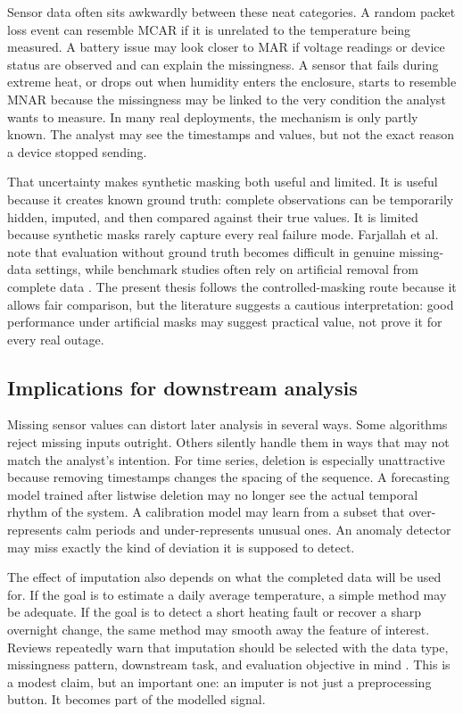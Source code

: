 Sensor data often sits awkwardly between these neat categories. A random packet loss event can resemble MCAR if it is unrelated to the temperature being measured. A battery issue may look closer to MAR if voltage readings or device status are observed and can explain the missingness. A sensor that fails during extreme heat, or drops out when humidity enters the enclosure, starts to resemble MNAR because the missingness may be linked to the very condition the analyst wants to measure. In many real deployments, the mechanism is only partly known. The analyst may see the timestamps and values, but not the exact reason a device stopped sending.

That uncertainty makes synthetic masking both useful and limited. It is useful because it creates known ground truth: complete observations can be temporarily hidden, imputed, and then compared against their true values. It is limited because synthetic masks rarely capture every real failure mode. Farjallah et al. note that evaluation without ground truth becomes difficult in genuine missing-data settings, while benchmark studies often rely on artificial removal from complete data \cite{Farjallah2025EvaluationOM,Toye2025BenchmarkingMD}. The present thesis follows the controlled-masking route because it allows fair comparison, but the literature suggests a cautious interpretation: good performance under artificial masks may suggest practical value, not prove it for every real outage.

\subsection{Implications for downstream analysis}

Missing sensor values can distort later analysis in several ways. Some algorithms reject missing inputs outright. Others silently handle them in ways that may not match the analyst's intention. For time series, deletion is especially unattractive because removing timestamps changes the spacing of the sequence. A forecasting model trained after listwise deletion may no longer see the actual temporal rhythm of the system. A calibration model may learn from a subset that over-represents calm periods and under-represents unusual ones. An anomaly detector may miss exactly the kind of deviation it is supposed to detect.

The effect of imputation also depends on what the completed data will be used for. If the goal is to estimate a daily average temperature, a simple method may be adequate. If the goal is to detect a short heating fault or recover a sharp overnight change, the same method may smooth away the feature of interest. Reviews repeatedly warn that imputation should be selected with the data type, missingness pattern, downstream task, and evaluation objective in mind \cite{Alwateer2024MissingDI,Adnan2022ARO,Miao2023AnES}. This is a modest claim, but an important one: an imputer is not just a preprocessing button. It becomes part of the modelled signal.

